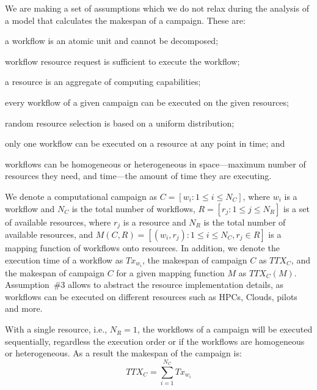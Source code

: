 We are making a set of assumptions which we do not relax during the analysis of a model that calculates the makespan of a campaign.
These are:
\begin{inparaenum}[(1)]
    \item a workflow is an atomic unit and cannot be decomposed;
    \item workflow resource request is sufficient to execute the workflow;
    \item a resource is an aggregate of computing capabilities;
    \item every workflow of a given campaign can be executed on the given resources;
    \item random resource selection is based on a uniform distribution;
    \item only one workflow can be executed on a resource at any point in time; and
    \item workflows can be homogeneous or heterogeneous in space---maximum number of resources they need, and time---the amount of time they are executing.
\end{inparaenum}

We denote a computational campaign as $C = [w_{i}: 1 \leq i \leq N_{C}]$, where $w_{i}$ is a workflow and $N_{C}$ is the total number of workflows, $R = [ r_{j}: 1 \leq j \leq N_{R}]$ is a set of available resources, where $r_{j}$ is a resource and $N_{R}$ is the total number of available resources, and $ M(C,R) = [(w_i, r_j): 1 \leq i \leq N_{C}, r_j \in R] $ is a mapping function of workflows onto resources.
In addition, we denote the execution time of a workflow as $Tx_{w_{i}}$, the makespan of campaign $C$ as $TTX_{C}$, and the makespan of campaign $C$ for a given mapping function $ M $ as $TTX_{C}(M)$.
Assumption~\#3 allows to abstract the resource implementation details, as workflows can be executed on different resources such as HPCs, Clouds, pilots and more. 

With a single resource, i.e., $N_{R} = 1$, the workflows of a campaign will be executed sequentially, regardless the execution order or if the workflows are homogeneous or heterogeneous.
As a result the makespan of the campaign is:
\begin{equation}
   TTX_{C} = \sum_{i=1}^{N_{C}}Tx_{w_{i}} 
\end{equation}

